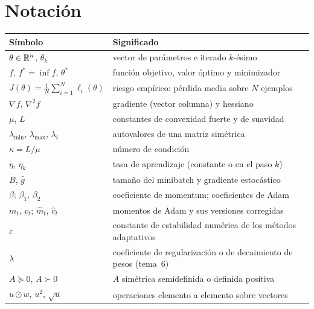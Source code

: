 \documentclass[11pt,a4paper,twoside,openany]{book}
\newcommand{\gb}{\hat g}
\begin{document}
\section*{Notación}
\begin{center}
\begin{tabular}{@{}ll@{}}
\toprule
Símbolo & Significado \\
\midrule
$\theta\in\mathbb{R}^{n}$, $\theta_k$ & vector de parámetros e iterado $k$-ésimo \\
$f$, $f^{\ast}=\inf f$, $\theta^{\ast}$ & función objetivo, valor óptimo y minimizador \\
$J(\theta)=\frac1N\sum_{i=1}^{N}\ell_i(\theta)$ & riesgo empírico: pérdida media sobre $N$ ejemplos \\
$\nabla f$, $\nabla^{2}f$ & gradiente (vector columna) y hessiano \\
$\mu$, $L$ & constantes de convexidad fuerte y de suavidad \\
$\lambda_{\min}$, $\lambda_{\max}$, $\lambda_i$ & autovalores de una matriz simétrica \\
$\kappa=L/\mu$ & número de condición \\
$\eta$, $\eta_k$ & tasa de aprendizaje (constante o en el paso $k$) \\
$B$, $\gb$ & tamaño del minibatch y gradiente estocástico \\
$\beta$; $\beta_1$, $\beta_2$ & coeficiente de momentum; coeficientes de Adam \\
$m_t$, $v_t$; $\hat m_t$, $\hat v_t$ & momentos de Adam y sus versiones corregidas \\
$\varepsilon$ & constante de estabilidad numérica de los métodos adaptativos \\
$\lambda$ & coeficiente de regularización o de decaimiento de pesos (tema~6) \\
$A\succeq 0$, $A\succ 0$ & $A$ simétrica semidefinida o definida positiva \\
$u\odot w$, $u^{2}$, $\sqrt{u}$ & operaciones elemento a elemento sobre vectores \\
\bottomrule
\end{tabular}
\end{center}


\tableofcontents

\mainmatter







\backmatter

\end{document}
